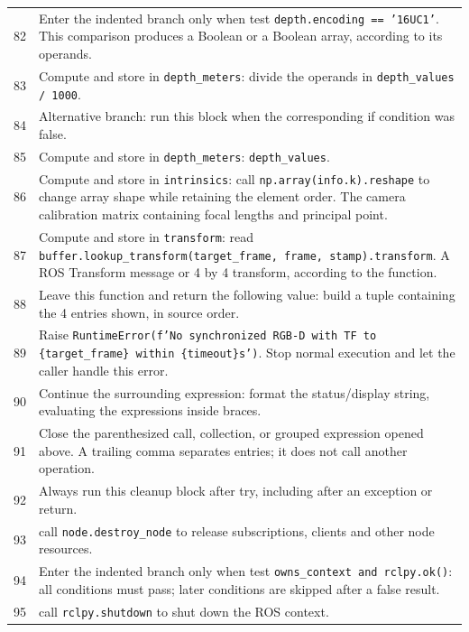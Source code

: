 \documentclass[11pt,a4paper]{book}
\begin{document}
\begin{longtable}{r p{}}
82 & Enter the indented branch only when test \texttt{depth.encoding == '16UC1'}. This comparison produces a Boolean or a Boolean array, according to its operands. \\

83 & Compute and store in \texttt{depth\_meters}: divide the operands in \texttt{depth\_values / 1000}.  \\

84 & Alternative branch: run this block when the corresponding if condition was false. \\

85 & Compute and store in \texttt{depth\_meters}: \texttt{depth\_values}.  \\

86 & Compute and store in \texttt{intrinsics}: call \texttt{np.array(info.k).reshape} to change array shape while retaining the element order. The camera calibration matrix containing focal lengths and principal point. \\

87 & Compute and store in \texttt{transform}: read \texttt{buffer.lookup\_transform(target\_frame, frame, stamp).transform}. A ROS Transform message or 4 by 4 transform, according to the function. \\

88 & Leave this function and return the following value: build a tuple containing the 4 entries shown, in source order. \\

89 & Raise \texttt{RuntimeError(f'No synchronized RGB-D with TF to \{target\_frame\} within \{timeout\}s')}. Stop normal execution and let the caller handle this error. \\

90 & Continue the surrounding expression: format the status/display string, evaluating the expressions inside braces. \\

91 & Close the parenthesized call, collection, or grouped expression opened above. A trailing comma separates entries; it does not call another operation. \\

92 & Always run this cleanup block after try, including after an exception or return. \\

93 & call \texttt{node.destroy\_node} to release subscriptions, clients and other node resources. \\

94 & Enter the indented branch only when test \texttt{owns\_context and rclpy.ok()}: all conditions must pass; later conditions are skipped after a false result. \\

95 & call \texttt{rclpy.shutdown} to shut down the ROS context. \\

\end{longtable}
\end{document}
